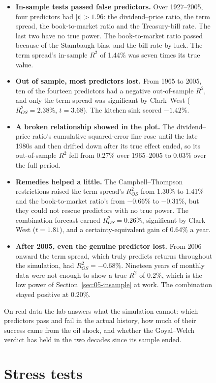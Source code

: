 \begin{figure}[htbp]
\begin{itemize}
  \item \textbf{In-sample tests passed false predictors.} Over 1927--2005, four predictors had $|t| > 1.96$: the dividend--price ratio, the term spread, the book-to-market ratio and the Treasury-bill rate. The last two have no true power. The book-to-market ratio passed because of the Stambaugh bias, and the bill rate by luck. The term spread's in-sample $R^2$ of 1.44\% was seven times its true value.
  \item \textbf{Out of sample, most predictors lost.} From 1965 to 2005, ten of the fourteen predictors had a negative out-of-sample $R^2$, and only the term spread was significant by Clark--West ($R^2_{OS} = 2.38\%$, $t = 3.68$). The kitchen sink scored $-1.42\%$.
  \item \textbf{A broken relationship showed in the plot.} The dividend--price ratio's cumulative squared-error line rose until the late 1980s and then drifted down after its true effect ended, so its out-of-sample $R^2$ fell from 0.27\% over 1965--2005 to 0.03\% over the full period.
  \item \textbf{Remedies helped a little.} The Campbell--Thompson restrictions raised the term spread's $R^2_{OS}$ from 1.30\% to 1.41\% and the book-to-market ratio's from $-0.66\%$ to $-0.31\%$, but they could not rescue predictors with no true power. The combination forecast earned $R^2_{OS} = 0.26\%$, significant by Clark--West ($t = 1.81$), and a certainty-equivalent gain of 0.64\% a year.
  \item \textbf{After 2005, even the genuine predictor lost.} From 2006 onward the term spread, which truly predicts returns throughout the simulation, had $R^2_{OS} = -0.68\%$. Nineteen years of monthly data were not enough to show a true $R^2$ of 0.2\%, which is the low power of Section~\ref{sec:05-insample} at work. The combination stayed positive at 0.20\%.
\end{itemize}

On real data the lab answers what the simulation cannot: which predictors pass and fail in the actual history, how much of their success came from the oil shock, and whether the Goyal--Welch verdict has held in the two decades since its sample ended.

\section{Stress tests}
\label{sec:05-stress}


\end{figure}
